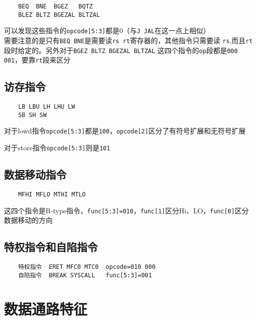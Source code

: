 \documentclass[UTF8]{ctexart}
\begin{document}
\begin{verbatim}
    BEQ  BNE  BGEZ   BQTZ 
    BLEZ BLTZ BGEZAL BLTZAL
\end{verbatim}

可以发现这些指令的\texttt{opcode[5:3]}都是0（与\texttt{J JAL}在这一点上相似）
\\

需要注意的是只有\texttt{BEQ BNE}是需要读\texttt{rs rt}寄存器的，其他指令只需要读
\texttt{rs},而且\texttt{rt}段时给定的。另外对于\texttt{BGEZ BLTZ BGEZAL BLTZAL}
这四个指令的\texttt{op}段都是\texttt{000 001}，要靠\texttt{rt}段来区分

\subsection{访存指令}

\begin{verbatim}
    LB LBU LH LHU LW
    SB SH SW
\end{verbatim}

对于lowd指令\texttt{opcode[5:3]}都是\texttt{100}，\texttt{opcode[2]}区分了有符号扩展和无符号扩展

对于store指令\texttt{opcode[5:3]}则是\texttt{101}

\subsection{数据移动指令}

\begin{verbatim}
    MFHI MFLO MTHI MTLO
\end{verbatim}

这四个指令是R-type指令，\texttt{func[5:3]=010}，\texttt{func[1]}区分Hi、LO，\texttt{func[0]}区分
数据移动的方向

\subsection{特权指令和自陷指令}

\begin{verbatim}      
    特权指令  ERET MFC0 MTC0  opcode=010 000
    自陷指令  BREAK SYSCALL   func[5:3]=001
\end{verbatim}


\section{数据通路特征}
\end{document}
